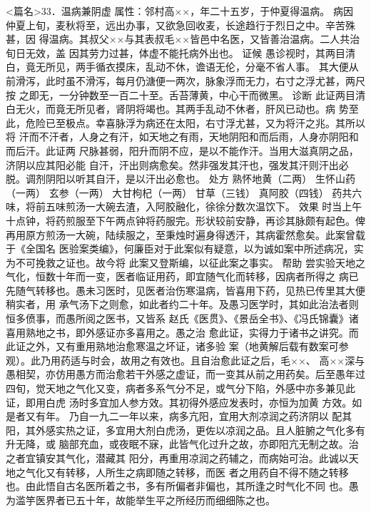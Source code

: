\documentclass[a4paper,12pt,UTF8,twoside]{ctexbook}
\begin{document}
<篇名>33．温病兼阴虚
属性：邻村高××，年二十五岁，于仲夏得温病。 
病因 仲夏上旬，麦秋将至，远出办事，又欲急回收麦，长途趋行于烈日之中。辛苦殊甚，因 
得温病。其叔父××与其表叔毛××皆邑中名医，又皆善治温病。二人共治旬日无效，盖 
因其劳力过甚，体虚不能托病外出也。 
证候 愚诊视时，其两目清白，竟无所见，两手循衣摸床，乱动不休，谵语无伦，分毫不省人事。 
其大便从前滑泻，此时虽不滑泻，每月仍溏便一两次，脉象浮而无力，右寸之浮尤甚，两尺按 
之即无，一分钟数至一百二十至。舌苔薄黄，中心干而微黑。 
诊断 此证两目清白无火，而竟无所见者，肾阴将竭也。其两手乱动不休者，肝风已动也。病 
势至此，危险已至极点。幸喜脉浮为病还在太阳，右寸浮尤甚，又为将汗之兆。其所以将 
汗而不汗者，人身之有汗，如天地之有雨，天地阴阳和而后雨，人身亦阴阳和而后汗。此证两 
尺脉甚弱，阳升而阴不应，是以不能作汗。当用大滋真阴之品，济阴以应其阳必能 
自汗，汗出则病愈矣。然非强发其汗也，强发其汗则汗出必脱。调剂阴阳以听其自汗，是以汗出必愈也。 
处方 熟怀地黄（二两） 生怀山药（一两） 玄参（一两） 大甘枸杞（一两） 
甘草（三钱） 真阿胶（四钱） 
药共六味，将前五味煎汤一大碗去渣，入阿胶融化，徐徐分数次温饮下。 
效果 时当上午十点钟，将药煎服至下午两点钟将药服完。形状较前安静，再诊其脉颇有起色。俾 
再用原方煎汤一大碗，陆续服之，至秉烛时遍身得透汗，其病霍然愈矣。此案曾载于《全国名 
医验案类编》，何廉臣对于此案似有疑意，以为诚如案中所述病况，实为不可挽救之证也。故今将 
此案又登斯编，以征此案之事实。 
帮助 尝实验天地之气化，恒数十年而一变，医者临证用药，即宜随气化而转移，因病者所得之 
病已先随气转移也。愚未习医时，见医者治伤寒温病，皆喜用下药，见热已传里其大便稍实者，用 
承气汤下之则愈，如此者约二十年。及愚习医学时，其如此治法者则恒多偾事，而愚所阅之医书，又皆系 
赵氏《医贯》、《景岳全书》、《冯氏锦囊》诸喜用熟地之书，即外感证亦多喜用之。愚之治 
愈此证，实得力于诸书之讲究。而此证之外，又有重用熟地治愈寒温之坏证，诸多验 
案（地黄解后载有数案可参观）。此乃用药适与时会，故用之有效也。且自治愈此证之后，毛××、 
高××深与愚相契，亦仿用愚方而治愈若干外感之虚证，而一变其从前之用药矣。后至愚年过 
四旬，觉天地之气化又变，病者多系气分不足，或气分下陷，外感中亦多兼见此证，即用白虎 
汤时多宜加人参方效。其初得外感应发表时，亦恒为加黄 方效。如是者又有年。 
乃自一九二一年以来，病多亢阳，宜用大剂凉润之药济阴以 
配其阳，其外感实热之证，多宜用大剂白虎汤，更佐以凉润之品。且人脏腑之气化多有升无降，或 
脑部充血，或夜眠不寐，此皆气化过升之故，亦即阳亢无制之故。治之者宜镇安其气化，潜藏其 
阳分，再重用凉润之药辅之，而病始可治。此诚以天地之气化又有转移，人所生之病即随之转移，而医 
者之用药自不得不随之转移也。由此悟自古名医所着之书，多有所偏者非偏也，其所逢之时气化不同 
也。愚为滥竽医界者已五十年，故能举生平之所经历而细细陈之也。 
\end{document}
